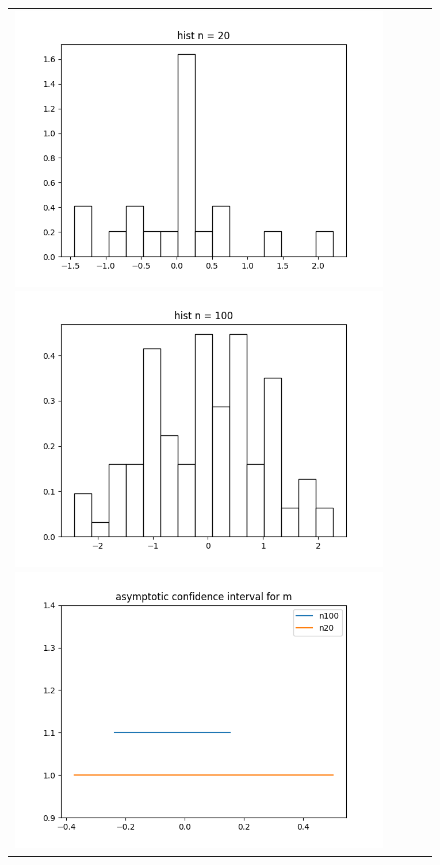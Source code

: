 \begin{figure}[H]
	\begin{tabular}{cccc}
		\includegraphics[scale=0.3]{hist_n_20.png}
		\includegraphics[scale=0.3]{hist_n_100.png}
		\includegraphics[scale=0.3]{asymptotic_m.png}

\end{tabular}
\end{figure}
